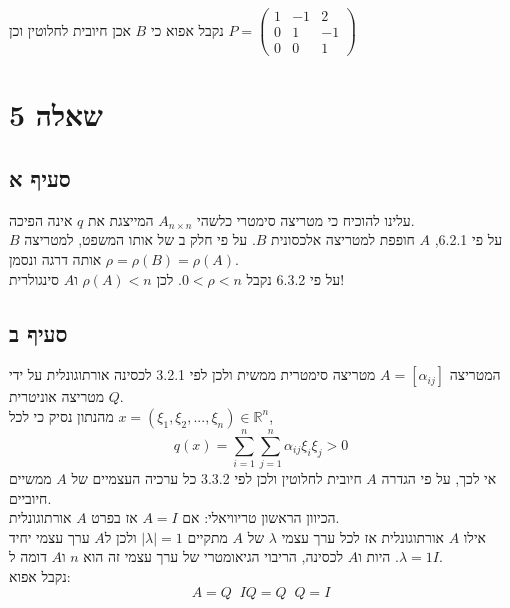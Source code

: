 \documentclass{article}
\def\reals{\mathbb{R}}
\DeclareMathOperator{\adj}{^\ast}
\DeclareMathOperator{\inv}{^{-1}}
\begin{document}
נקבל אפוא כי $B$ אכן חיובית לחלוטין וכן $P=\begin{pmatrix}
        1 & -1 & 2  \\
        0 & 1  & -1 \\
        0 & 0  & 1
    \end{pmatrix}$


\pagebreak

\section*{שאלה 5}

\subsection*{סעיף א}

עלינו להוכיח כי מטריצה סימטרי כלשהי $A_{n\times n}$ המייצגת את $q$ אינה הפיכה. \\
על פי 6.2.1, $A$ חופפת למטריצה אלכסונית $B$. על פי חלק ב של אותו המשפט, למטריצה $B$ אותה דרגה ונסמן $\rho=\rho(B)=\rho(A)$. \\
על פי 6.3.2 נקבל $0<\rho<n$. לכן $\rho(A)<n$ ו$A$ סינגולרית!

\subsection*{סעיף ב}

המטריצה $A=[\alpha_{ij}]$ מטריצה סימטרית ממשית ולכן לפי 3.2.1 לכסינה אורתוגונלית על ידי מטריצה אוניטרית $Q$. \\
מהנתון נסיק כי לכל $x=(\xi_1, \xi_2, ..., \xi_n)\in \reals^n$,
\[
    q(x)=\sum_{i=1}^{n}\sum_{j=1}^{n} \alpha_{ij}\xi_i\xi_j>0
\]
אי לכך, על פי הגדרה $A$ חיובית לחלוטין ולכן לפי 3.3.2 כל ערכיה העצמיים של $A$ ממשיים חיוביים. \\
הכיוון הראשון טריוויאלי: אם $A=I$ אז בפרט $A$ אורתוגונלית. \\
אילו $A$ אורתוגונלית אז לכל ערך עצמי $\lambda$ של $A$ מתקיים $|\lambda|=1$ ולכן ל$A$ ערך עצמי יחיד $\lambda=1$.
היות ו$A$ לכסינה, הריבוי הגיאומטרי של ערך עצמי זה הוא $n$ ו$A$ דומה ל$I$. \\
נקבל אפוא:
\[
    A=Q\adj I Q = Q \inv Q = I
\]
\end{document}
